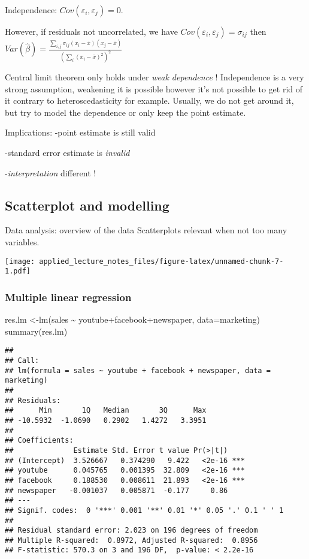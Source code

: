 \documentclass[
]{article}
\newenvironment{Shaded}{\begin{snugshade}}{\end{snugshade}}
\newcommand{\AttributeTok}[1]{\textcolor[rgb]{0.77,0.63,0.00}{#1}}
\newcommand{\FunctionTok}[1]{\textcolor[rgb]{0.00,0.00,0.00}{#1}}
\newcommand{\NormalTok}[1]{#1}
\newcommand{\OtherTok}[1]{\textcolor[rgb]{0.56,0.35,0.01}{#1}}
\newcommand{\SpecialCharTok}[1]{\textcolor[rgb]{0.00,0.00,0.00}{#1}}
\begin{document}
Independence: \(Cov(\varepsilon_i,\varepsilon_j)=0\).

However, if residuals not uncorrelated, we have
\(Cov(\varepsilon_i,\varepsilon_j)=\sigma_{ij}\) then
\(Var(\hat{\beta})=\frac{\sum_{i,j}\sigma_{ij}(x_i-\bar{x})(x_j-\bar{x})}{(\sum_i (x_i-\bar{x})^2)^2}\)

Central limit theorem only holds under \emph{weak dependence} !
Independence is a very strong assumption, weakening it is possible
however it's not possible to get rid of it contrary to
heteroscedasticity for example. Usually, we do not get around it, but
try to model the dependence or only keep the point estimate.

Implications: -point estimate is still valid

-standard error estimate is \emph{invalid}

-\emph{interpretation} different !

\hypertarget{scatterplot-and-modelling}{%
\subsection{Scatterplot and modelling}\label{scatterplot-and-modelling}}

Data analysis: overview of the data Scatterplots relevant when not too
many variables.

\texttt{[image: applied\_lecture\_notes\_files/figure-latex/unnamed-chunk-7-1.pdf]}

\hypertarget{multiple-linear-regression}{%
\subsubsection{Multiple linear
regression}\label{multiple-linear-regression}}

\begin{Shaded}
\begin{Highlighting}[]
\NormalTok{res.lm }\OtherTok{\textless{}{-}}\FunctionTok{lm}\NormalTok{(sales }\SpecialCharTok{\textasciitilde{}}\NormalTok{ youtube}\SpecialCharTok{+}\NormalTok{facebook}\SpecialCharTok{+}\NormalTok{newspaper, }\AttributeTok{data=}\NormalTok{marketing) }
\FunctionTok{summary}\NormalTok{(res.lm)}
\end{Highlighting}
\end{Shaded}

\begin{verbatim}
## 
## Call:
## lm(formula = sales ~ youtube + facebook + newspaper, data = marketing)
## 
## Residuals:
##      Min       1Q   Median       3Q      Max 
## -10.5932  -1.0690   0.2902   1.4272   3.3951 
## 
## Coefficients:
##              Estimate Std. Error t value Pr(>|t|)    
## (Intercept)  3.526667   0.374290   9.422   <2e-16 ***
## youtube      0.045765   0.001395  32.809   <2e-16 ***
## facebook     0.188530   0.008611  21.893   <2e-16 ***
## newspaper   -0.001037   0.005871  -0.177     0.86    
## ---
## Signif. codes:  0 '***' 0.001 '**' 0.01 '*' 0.05 '.' 0.1 ' ' 1
## 
## Residual standard error: 2.023 on 196 degrees of freedom
## Multiple R-squared:  0.8972, Adjusted R-squared:  0.8956 
## F-statistic: 570.3 on 3 and 196 DF,  p-value: < 2.2e-16
\end{verbatim}
\end{document}
